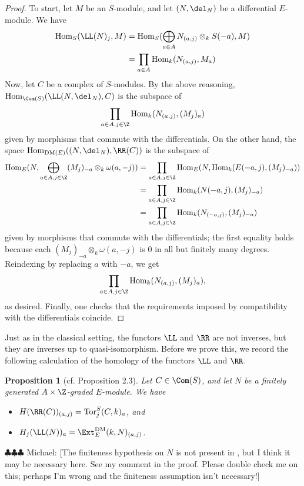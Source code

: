 \documentclass[12pt]{amsart}
\newtheorem{prop}[lemma]{Proposition}
\theoremstyle{definition}
\theoremstyle{remark}
\newcommand{\Hom}{\operatorname{Hom}} %
\newcommand{\michael}[1]{{\color{red} \sf $\clubsuit\clubsuit\clubsuit$ Michael: [#1]}}
\def\on{\operatorname}
\def\om{\omega}
\def\DM{\operatorname{DM}}
\def\om{\omega}
\begin{document}
\begin{proof}
To start, let $M$ be an $S$-module, and let $(N, \del_N)$ be a differential $E$-module. We have
\begin{align*}
\Hom_S( \LL(N)_j, M) &= \Hom_S(\bigoplus_{a \in A} N_{(a, j)} \otimes_k S(-a), M) \\
&=  \prod_{a \in A} \Hom_k ( N_{(a, j)} , M_a)\\
\end{align*}
Now, let $C$ be a complex of $S$-modules. By the above reasoning, $\Hom_{\Com(S)}( \LL(N, \del_N), C)$ is the subspace of 
$$
\prod_{a \in A, j \in \Z} \Hom_k ( N_{(a, j)} , (M_j)_{a})
$$
given by morphisms that commute with the differentials. On the other hand, the space $\Hom_{\DM(E)}((N, \del_N), \RR(C))$ is the subspace of 
\begin{align*}
\Hom_E(N, \bigoplus_{a \in A, j \in \Z} (M_j)_{-a} \otimes_k \om(a, -j)) &= \prod_{a \in A, j \in \Z}\Hom_E(N,  \Hom_k(E(-a, j), (M_j)_{-a}  ))  \\
&=   \prod_{a \in A, j \in \Z} \Hom_k(N(-a, j),  (M_j)_{-a} ) \\
&=  \prod_{a \in A, j \in \Z} \Hom_k(N_{(-a, j)},   (M_j)_{-a} )
\end{align*}
given by morphisms that commute with the differentials; the first equality holds because each $(M_j)_{-a} \otimes_k \om(a, -j)$ is 0 in all but finitely many degrees. Reindexing by replacing $a$ with $-a$, we get
$$
\prod_{a \in A, j \in \Z} \Hom_k(N_{(a, j)},   (M_j)_{a} ),
$$
as desired. Finally, one checks that the requirements imposed by compatibility with the differentials coincide.\end{proof}


Just as in the classical setting, the functors $\LL$ and $\RR$ are not inverses, but they are inverses up to quasi-isomorphism. Before we prove this, we record the following calculation of the homology of the functors $\LL$ and $\RR$.

\begin{prop}[cf. \cite{EFS} Proposition 2.3]
\label{tor} 
Let $C \in \Com(S)$, and let $N$ be a finitely generated $A \times \Z$-graded $E$-module. We have
\begin{itemize}
\item[(a)] $H(\RR(C))_{(a, j)} = \on{Tor}_j^S(C, k)_a$, and
\item[(b)] $H_j(\LL(N))_a=\Ext^{\DM}_E(k, N)_{(a, j)}$.
\end{itemize}
\end{prop}
\michael{The finiteness hypothesis on $N$ is not present in \cite[Proposition 2.3]{EFS}, but I think it may be necessary here. See my comment in the proof. Please double check me on this; perhaps I'm wrong and the finiteness assumption isn't necessary!}
\end{document}
